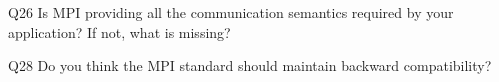 \begin{description}%
\item{Q26} Is MPI providing all the communication semantics required by your application? If not, what is missing?%
\item{Q28} Do you think the MPI standard should maintain backward compatibility?%
\end{description}%
